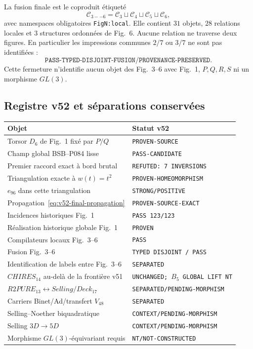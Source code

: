 La fusion finale est le coproduit étiqueté
\[
 \mathcal C_{3--6}
 =\mathcal C_3\sqcup\mathcal C_4\sqcup\mathcal C_5\sqcup\mathcal C_6,
\]
avec namespaces obligatoires \texttt{FigN:local}. Elle contient $31$ objets, $28$ relations locales et $3$ structures ordonnées de Fig.~6. Aucune relation ne traverse deux figures. En particulier les impressions communes $2/7$ ou $3/7$ ne sont pas identifiées :
\[
 \boxed{\texttt{PASS-TYPED-DISJOINT-FUSION/PROVENANCE-PRESERVED}.}
\]
Cette fermeture n'identifie aucun objet des Fig.~3--6 avec Fig.~1, $P,Q,R,S$ ni un morphisme $GL(3)$.

\subsection{Registre v52 et séparations conservées}

\begin{longtable}{@{}p{}p{}@{}}
\toprule
Objet & Statut v52\\
\midrule
Torsor $D_6$ de Fig.~1 fixé par $P/Q$ & \texttt{PROVEN-SOURCE}\\
Champ global BSB--P084 lisse & \texttt{PASS-CANDIDATE}\\
Premier raccord exact à bord brutal & \texttt{REFUTED: 7 INVERSIONS}\\
Triangulation exacte à $w(t)=t^2$ & \texttt{PROVEN-HOMEOMORPHISM}\\
$e_{96}$ dans cette triangulation & \texttt{STRONG/POSITIVE}\\
Propagation~\eqref{eq:v52-final-propagation} & \texttt{PROVEN-SOURCE-EXACT}\\
Incidences historiques Fig.~1 & \texttt{PASS 123/123}\\
Réalisation historique globale Fig.~1 & \texttt{PROVEN}\\
Compilateurs locaux Fig.~3--6 & \texttt{PASS}\\
Fusion Fig.~3--6 & \texttt{TYPED DISJOINT / PASS}\\
Identification de labels entre Fig.~3--6 & \texttt{SEPARATED}\\
$CHIRES_{14}$ au-delà de la frontière v51 & \texttt{UNCHANGED; $B_5$ GLOBAL LIFT NT}\\
$R2PURE_{13}\leftrightarrow Selling/Deck_{17}$ & \texttt{SEPARATED/}\allowbreak\texttt{PENDING-MORPHISM}\\
Carriers Binet/Ad/transfert $V_{48}$ & \texttt{SEPARATED}\\
Selling--Noether biquadratique & \texttt{CONTEXT/}\allowbreak\texttt{PENDING-MORPHISM}\\
Selling $3D\to5D$ & \texttt{CONTEXT/}\allowbreak\texttt{PENDING-MORPHISM}\\
Morphisme $GL(3)$-équivariant requis & \texttt{NT/NOT-CONSTRUCTED}\\
\bottomrule
\end{longtable}

